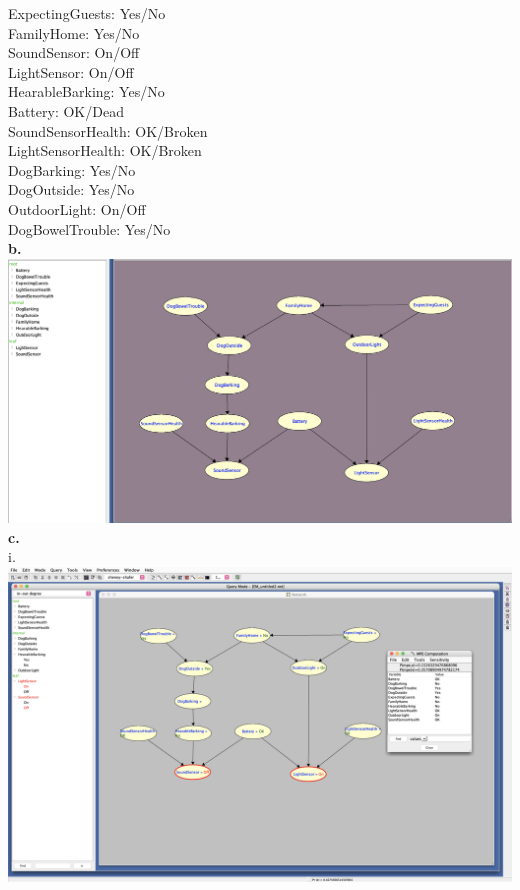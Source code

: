 \documentclass[11pt, oneside]{article}   	%
\begin{document}
\noindent ExpectingGuests: Yes/No\\
FamilyHome: Yes/No\\
SoundSensor: On/Off\\
LightSensor: On/Off\\
HearableBarking: Yes/No\\
Battery: OK/Dead\\
SoundSensorHealth: OK/Broken\\
LightSensorHealth: OK/Broken\\
DogBarking: Yes/No\\
DogOutside: Yes/No\\
OutdoorLight: On/Off\\
DogBowelTrouble: Yes/No\\

\noindent{}\textbf{b.}\\

\noindent{}\includegraphics[scale=0.4]{Q2b}\\

\pagebreak
\noindent{}\textbf{c.}\\

\noindent{}i. \\

\noindent{}\includegraphics[scale=0.25]{Q2ci}\\
\end{document}
